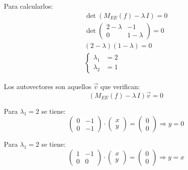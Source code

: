\begin{mdframed}[style=ExampleFrame]
    Para calcularlos:
    \begin{gather*}
        \operatorname{det} \left( M_{EE}(f) - \lambda \, I \right) = 0
        \\[1ex]
        \operatorname{det}
        \begin{pmatrix}
            2-\lambda & -1
            \\
            0 & 1-\lambda
        \end{pmatrix}
        = 0
        \\[1ex]
        \left( 2-\lambda \right) \left( 1-\lambda \right) = 0
        \\[1ex]
        \left\{
        \begin{aligned}
        \lambda_1 &= 2
        \\
        \lambda_2 &= 1
        \end{aligned}
        \right.
    \end{gather*}
    
    Los autovectores son aquellos $\Vec{v}$ que verifican:
    \begin{equation*}
        \left( M_{EE}(f) - \lambda \, I \right) \Vec{v} = 0
    \end{equation*}
    
    Para $\lambda_1=2$ se tiene:
    \begin{equation}
        \begin{pmatrix}
            0 & -1
            \\
            0 & -1
        \end{pmatrix}
        \cdot
        \begin{pmatrix}
            x
            \\
            y
        \end{pmatrix}
        =
        \begin{pmatrix}
            0
            \\
            0
        \end{pmatrix}
        \Rightarrow y=0
    \end{equation}
    
    Para $\lambda_1=2$ se tiene:
    \begin{equation}
        \begin{pmatrix}
            1 & -1
            \\
            0 & 0
        \end{pmatrix}
        \cdot
        \begin{pmatrix}
            x
            \\
            y
        \end{pmatrix}
        =
        \begin{pmatrix}
            0
            \\
            0
        \end{pmatrix}
        \Rightarrow y=x
    \end{equation}
    

\end{mdframed}
